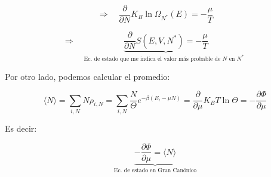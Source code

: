 \documentclass{article}
\begin{document}
\[  \Rightarrow \quad \frac{  \partial }{\partial N} K_{B}\ln \Omega_{N^{\ast}}(E) = - \frac{\mu}{T}   \]



\[  \Rightarrow \quad  \underbrace{ \frac{\partial }{\partial N}   S(E,V,N^{\ast}) = - \frac{\mu}{T}}_{\text{Ec. de estado que me indica el valor más probable de $N$ en $N^{\ast}$ }}  \]

Por otro lado, podemos calcular el promedio:



\[  \langle N \rangle = \sum\limits_{i,N} N \rho_{i,N} = \sum\limits_{i,N}  \frac{ N }{\Theta} e^{  -\beta (E_{i}  - \mu N )  } = \frac{\partial }{\partial \mu} K_{B}T \ln \Theta = - \frac{  \partial \Phi }{\partial \mu } \]


Es decir:



\[   \underbrace{-\frac{ \partial \Phi   }{\partial \mu} = \langle N \rangle}_{ \text{Ec. de estado en Gran Canónico} }   \]

 
\end{document}
